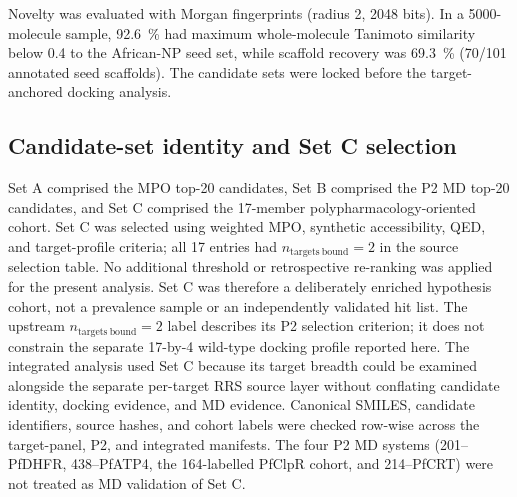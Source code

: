 \documentclass[journal=jcisd8,manuscript=article]{achemso}
\begin{document}
Novelty was evaluated with Morgan fingerprints \cite{Rogers2010} (radius \num{2}, \num{2048} bits). In a \num{5000}-molecule sample, \qty{92.6}{\percent} had maximum whole-molecule Tanimoto similarity below \num{0.4} to the African-NP seed set, while scaffold recovery was \qty{69.3}{\percent} (\num{70}/\num{101} annotated seed scaffolds). The candidate sets were locked before the target-anchored docking analysis.

\subsection{Candidate-set identity and Set C selection}
Set A comprised the MPO top-20 candidates, Set B comprised the P2 MD top-20 candidates, and Set C comprised the 17-member polypharmacology-oriented cohort. Set C was selected using weighted MPO, synthetic accessibility, QED, and target-profile criteria; all 17 entries had $n_{\mathrm{targets\ bound}}=2$ in the source selection table. No additional threshold or retrospective re-ranking was applied for the present analysis. Set C was therefore a deliberately enriched hypothesis cohort, not a prevalence sample or an independently validated hit list. The upstream $n_{\mathrm{targets\ bound}}=2$ label describes its P2 selection criterion; it does not constrain the separate 17-by-4 wild-type docking profile reported here. The integrated analysis used Set C because its target breadth could be examined alongside the separate per-target RRS source layer without conflating candidate identity, docking evidence, and MD evidence. Canonical SMILES, candidate identifiers, source hashes, and cohort labels were checked row-wise across the target-panel, P2, and integrated manifests. The four P2 MD systems (201--PfDHFR, 438--PfATP4, the 164-labelled PfClpR cohort, and 214--PfCRT) were not treated as MD validation of Set C.
\end{document}
